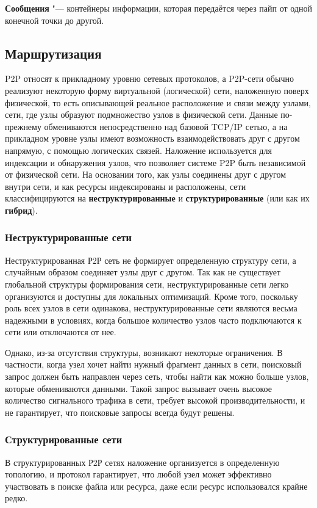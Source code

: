 \documentclass[bachelor, och, coursework]{SCWorks}
\begin{document}
\textbf{Сообщения} "--- контейнеры информации, которая передаётся через пайп от одной конечной точки до другой.

\subsection{Маршрутизация}
P2P относят к прикладному уровню сетевых протоколов, а P2P-сети обычно реализуют некоторую форму виртуальной (логической) сети, наложенную поверх физической, то есть описывающей реальное расположение
и связи между узлами, сети, где узлы образуют подмножество узлов в физической сети. 
Данные по-прежнему обмениваются непосредственно над базовой TCP/IP сетью, 
а на прикладном уровне узлы имеют возможность взаимодействовать друг с другом напрямую, 
с помощью логических связей. Наложение используется для индексации и обнаружения узлов, 
что позволяет системе P2P быть независимой от физической сети. На основании того, как узлы соединены 
друг с другом внутри сети, и как ресурсы индексированы и расположены, сети классифицируются на 
\textbf{неструктурированные} и \textbf{структурированные} (или как их \textbf{гибрид}).

\subsubsection{Неструктурированные сети}
Неструктурированная Р2Р сеть не формирует определенную структуру сети, а случайным образом соединяет узлы друг с другом. 
Так как не существует глобальной структуры формирования сети, неструктурированные сети легко организуются и доступны для локальных оптимизаций. 
Кроме того, поскольку роль всех узлов в сети одинакова, неструктурированные сети являются весьма надежными в условиях, 
когда большое количество узлов часто подключаются к сети или отключаются от нее.

Однако, из-за отсутствия структуры, возникают некоторые ограничения. 
В частности, когда узел хочет найти нужный фрагмент данных в сети, поисковый запрос должен быть направлен через сеть, 
чтобы найти как можно больше узлов, которые обмениваются данными. Такой запрос вызывает очень высокое количество сигнального трафика в сети, 
требует высокой производительности, и не гарантирует, что поисковые запросы всегда будут решены.

\subsubsection{Структурированные сети}
В структурированных Р2Р сетях наложение организуется в определенную топологию, и протокол гарантирует, 
что любой узел может эффективно участвовать в поиске файла или ресурса, даже если ресурс использовался крайне редко.
\end{document}
